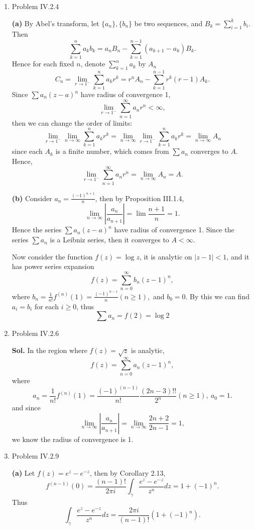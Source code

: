 \documentclass{article}%
\begin{document}
\begin{enumerate}

\item Problem IV.2.4

\textbf{(a)}
By Abel's transform, let $\{a_n\}, \{b_n\}$ be two sequences, and $B_k = \sum\limits_{i=1}^{k}b_i $. Then
$$
\sum_{k=1}^{n}a_kb_k = a_nB_n - \sum_{k=1}^{n-1}(a_{k+1}-a_k)B_k.
$$
Hence for each fixed $n$, denote $\sum\limits_{k=1}^{n}a_k $ by $A_n $
$$
C_n = \lim_{r\to1^-}\sum_{k=1}^{n}a_kr^k = r^nA_n - \sum_{k=1}^{n-1}r^k(r-1)A_k.
$$
Since $\sum a_n(z-a)^n $ have radius of convergence 1,
$$
\lim_{r\to 1^-} \sum_{n=1}^{\infty}a_nr^n < \infty,
$$
then we can change the order of limits:
$$
\lim_{r\to 1^-}\lim_{n\to\infty}\sum_{k=1}^{n}a_kr^k = \lim_{n\to\infty}\lim_{r\to 1^-}\sum_{k=1}^{n}a_kr^k = \lim_{n\to\infty} A_n
$$
since each $A_k $ is a finite number, which comes from $\sum a_n $ converges to $A$. Hence,
$$
\lim_{r\to 1^-}\sum_{n=1}^{\infty}a_nr^n = \lim_{n\to\infty} A_n = A.
$$

\textbf{(b)}
Consider $a_n = \frac{(-1)^{n+1}}{n} $, then by Proposition III.1.4,
$$
\lim_{n\to\infty}\left|\frac{a_n}{a_{n+1}}\right| = \lim\frac{n+1}{n} = 1.
$$
Hence the series $\sum a_n(z-a)^n $ have radius of convergence 1. Since the series $\sum a_n $ is a Leibniz series, then it converges to $A < \infty$.

Now consider the function $f(z) = \log z$, it is analytic on $|z-1| < 1$, and it has power series expansion
$$
f(z) = \sum_{n=0}^{\infty}b_n (z-1)^n,
$$
where $b_n = \frac{1}{n!}f^{(n)}(1) = \frac{(-1)^{n-1}}{n} (n \ge 1), $ and $b_0 = 0 $. By this we can find $a_i = b_i $ for each $i \ge 0$, thus
$$
\sum a_n = f(2) = \log 2
$$


\item Problem IV.2.6

\textbf{Sol.} In the region where $f(z) = \sqrt{z}$ is analytic, 
$$
f(z) = \sum_{n=0}^{\infty}a_n(z-1)^n,
$$
where
$$
a_n = \frac{1}{n!}f^{(n)}(1) = \frac{(-1)^{(n-1)}}{n!}\frac{(2n-3)!!}{2^{n}} (n \ge 1), ~a_0 = 1.
$$
and since
$$
\lim_{n\to\infty}\left|\frac{a_n}{a_{n+1}}\right| = \lim_{n\to\infty} \frac{2n+2}{2n-1} = 1,
$$
we know the radius of convergence is 1.

\item Problem IV.2.9

\textbf{(a)}
Let $f(z) = e^{z}-e^{-z} $, then by Corollary 2.13,
$$
f^{(n-1)}(0) = \frac{(n-1)!}{2\pi i}\int_{\gamma}\frac{e^z-e^{-z}}{z^n}dz = 1+(-1)^{n}.
$$
Thus
$$
\int_{\gamma}\frac{e^z-e^{-z}}{z^n}dz = \frac{2\pi i}{(n-1)!}(1+(-1)^n).
$$


\end{enumerate}
\end{document}
